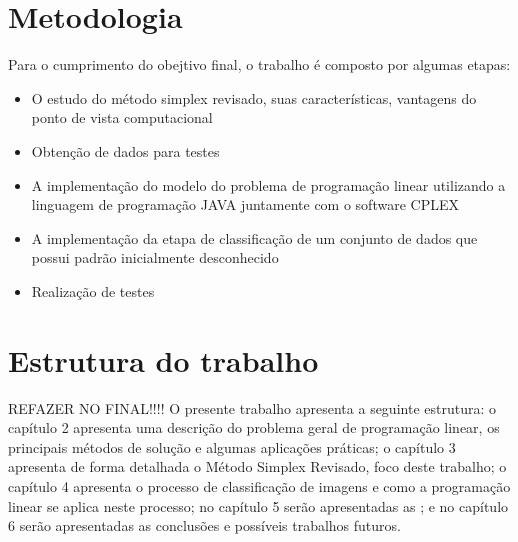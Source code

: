 \section{Metodologia}
Para o cumprimento do obejtivo final, o trabalho é composto por algumas etapas:

\begin{itemize} 
\item O estudo do método simplex revisado, suas características, vantagens do ponto de vista computacional
\item Obtenção de dados para testes
\item A implementação do modelo do problema de programação linear utilizando a linguagem de programação JAVA juntamente com o software CPLEX
\item A implementação da etapa de classificação de um conjunto de dados que possui padrão inicialmente desconhecido
\item Realização de testes 
\end{itemize}

\section{Estrutura do trabalho}
REFAZER NO FINAL!!!!
O presente trabalho apresenta a seguinte estrutura: o capítulo 2 apresenta uma descrição do problema geral de programação linear, os principais métodos de solução e algumas aplicações práticas; o capítulo 3 apresenta de forma detalhada o Método Simplex Revisado, foco deste trabalho; o capítulo 4 apresenta o processo de classificação de imagens e como a programação linear se aplica neste processo; no capítulo 5 serão apresentadas as ; e no capítulo 6 serão apresentadas as conclusões e possíveis trabalhos futuros. 
